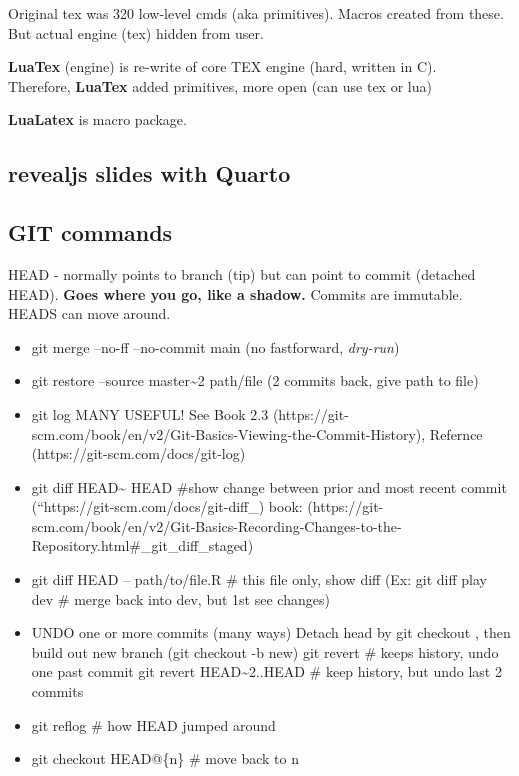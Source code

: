 \documentclass[
]{report}
\begin{document}
Original tex was 320 low-level cmds (aka primitives). Macros created
from these. But actual engine (tex) hidden from user.

\textbf{LuaTex} (engine) is re-write of core TEX engine (hard, written
in C).\\
Therefore, \textbf{LuaTex} added primitives, more open (can use tex or
lua)

\textbf{LuaLatex} is macro package.

\subsection{revealjs slides with
Quarto}\label{revealjs-slides-with-quarto}

\subsection{GIT commands}\label{git-commands}

HEAD - normally points to branch (tip) but can point to commit (detached
HEAD). \textbf{Goes where you go, like a shadow.} Commits are immutable.
HEADS can move around.

\begin{itemize}
\item
  git merge --no-ff --no-commit main (no fastforward, \emph{dry-run})
\item
  git restore --source master\textasciitilde2 path/file (2 commits back,
  give path to file)
\item
  git log MANY USEFUL! See Book 2.3
  (https://git-scm.com/book/en/v2/Git-Basics-Viewing-the-Commit-History),
  Refernce (https://git-scm.com/docs/git-log)
\item
  git diff HEAD\textasciitilde{} HEAD \#show change between prior and
  most recent commit (``https://git-scm.com/docs/git-diff\_) book:
  (https://git-scm.com/book/en/v2/Git-Basics-Recording-Changes-to-the-Repository.html\#\_git\_diff\_staged)
\item
  git diff HEAD -- path/to/file.R \# this file only, show diff (Ex: git
  diff play dev \# merge back into dev, but 1st see changes)
\item[$\square$]
  UNDO one or more commits (many ways) Detach head by git checkout ,
  then build out new branch (git checkout -b new) git revert \# keeps
  history, undo one past commit git revert HEAD\textasciitilde2..HEAD \#
  keep history, but undo last 2 commits
\item
  git reflog \# how HEAD jumped around
\item
  git checkout HEAD@\{n\} \# move back to n
\end{itemize}
\end{document}
